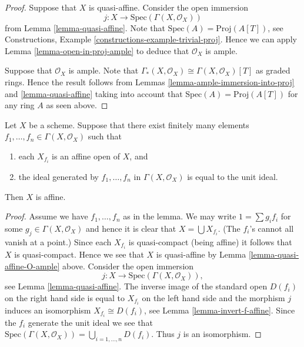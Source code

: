 \begin{proof}
Suppose that $X$ is quasi-affine. Consider the open immersion
$$
j : X \longrightarrow \text{Spec}(\Gamma(X, \mathcal{O}_X))
$$
from Lemma \ref{lemma-quasi-affine}. Note that
$\text{Spec}(A) = \text{Proj}(A[T])$, see
Constructions, Example \ref{constructions-example-trivial-proj}.
Hence we can apply Lemma \ref{lemma-open-in-proj-ample}
to deduce that $\mathcal{O}_X$ is ample.

\medskip\noindent
Suppose that $\mathcal{O}_X$ is ample.
Note that $\Gamma_*(X, \mathcal{O}_X) \cong \Gamma(X, \mathcal{O}_X)[T]$
as graded rings. Hence the result follows from Lemmas
\ref{lemma-ample-immersion-into-proj} and \ref{lemma-quasi-affine}
taking into account that
$\text{Spec}(A) = \text{Proj}(A[T])$ for any ring $A$
as seen above.
\end{proof}

\begin{lemma}
\label{lemma-characterize-affine}
Let $X$ be a scheme. Suppose that there exist finitely many elements
$f_1, \ldots, f_n \in \Gamma(X, \mathcal{O}_X)$ such that
\begin{enumerate}
\item each $X_{f_i}$ is an affine open of $X$, and
\item the ideal generated by $f_1, \ldots, f_n$ in
$\Gamma(X, \mathcal{O}_X)$ is equal to the unit ideal.
\end{enumerate}
Then $X$ is affine.
\end{lemma}

\begin{proof}
Assume we have $f_1, \ldots, f_n$ as in the lemma.
We may write $1 = \sum g_i f_i$ for some $g_j \in \Gamma(X, \mathcal{O}_X)$
and hence it is clear that $X = \bigcup X_{f_i}$. (The $f_i$'s cannot
all vanish at a point.) Since each $X_{f_i}$
is quasi-compact (being affine) it follows that $X$ is quasi-compact.
Hence we see that $X$ is quasi-affine by
Lemma \ref{lemma-quasi-affine-O-ample} above.
Consider the open immersion
$$
j : X \to \text{Spec}(\Gamma(X, \mathcal{O}_X)),
$$
see Lemma \ref{lemma-quasi-affine}. The inverse image of the standard open
$D(f_i)$ on the right hand side is equal to $X_{f_i}$ on the
left hand side and the morphism $j$ induces an isomorphism
$X_{f_i} \cong D(f_i)$, see
Lemma \ref{lemma-invert-f-affine}. Since the $f_i$ generate the unit ideal
we see that $\text{Spec}(\Gamma(X, \mathcal{O}_X))
= \bigcup_{i = 1, \ldots, n} D(f_i)$. Thus $j$ is an isomorphism.
\end{proof}







